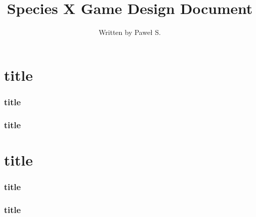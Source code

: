 \documentclass[10pt,a4paper,oneside]{article}
\author{Written by Paweł S.}
\title{Species X Game Design Document}
\begin{document}
\maketitle
\newpage
\tableofcontents
\newpage

\part{title}
	\section{title}
	\section{title}
\part{title}
	\section{title}
	\section{title}
\end{document}
